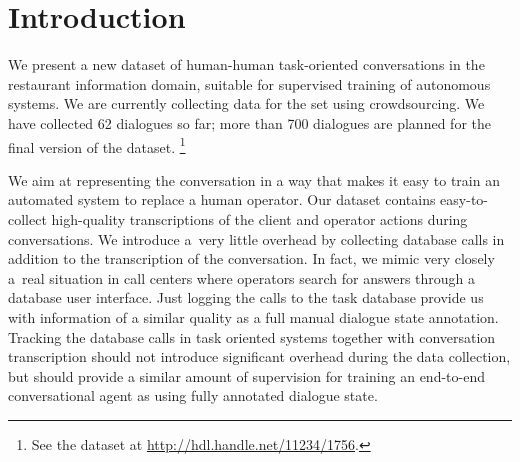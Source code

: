 \documentclass[runningheads,a4paper]{llncs}
\begin{document}
\section{Introduction}\label{sec:intro}
\vspace{-0.50em}
We present a new dataset of human-human task-oriented conversations in the restaurant information domain, suitable for supervised training of autonomous systems. 
We are currently collecting data for the set using crowdsourcing. We have collected 62 dialogues so far; more than 700 dialogues are planned for the final version of the dataset.
\footnote{See the dataset at \url{http://hdl.handle.net/11234/1756}.}

We aim at representing the conversation in a way that makes it easy to train an automated system to replace a human operator. 
Our dataset contains easy-to-collect high-quality transcriptions of the client and operator actions during conversations.
We introduce a~very little overhead by collecting database calls in addition to the transcription of the conversation.
In fact, we mimic very closely a~real situation in call centers where operators search for answers through a database user interface. 
Just logging the calls to the task database provide us with information of a similar quality as a full manual dialogue state annotation.
Tracking the database calls in task oriented systems together with conversation transcription should not introduce significant overhead during the data collection, but should provide a similar amount of supervision for training an end-to-end conversational agent as using fully annotated dialogue state.
\end{document}
